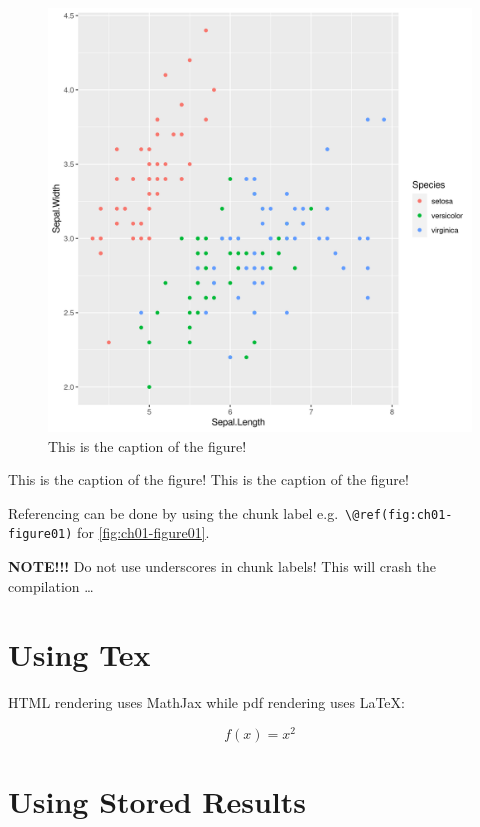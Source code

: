 \documentclass[
]{krantz}
\begin{document}
\begin{figure}

{\centering \includegraphics[width=0.8\linewidth]{figures/01-chapter1/ch01-figure01} 

}

\caption{This is the caption of the figure!}\label{fig:ch01-figure01-old}
\end{figure}

This is the caption of the figure! This is the caption of the figure!

Referencing can be done by using the chunk label e.g.~\texttt{\textbackslash{}@ref(fig:ch01-figure01)} for \ref{fig:ch01-figure01}.

\textbf{NOTE!!!} Do not use underscores in chunk labels! This will crash the compilation \ldots{}

\hypertarget{using-tex-1}{%
\section{Using Tex}\label{using-tex-1}}

HTML rendering uses MathJax while pdf rendering uses LaTeX:

\[
f(x) = x^2
\]

\hypertarget{using-stored-results-1}{%
\section{Using Stored Results}\label{using-stored-results-1}}
\end{document}
